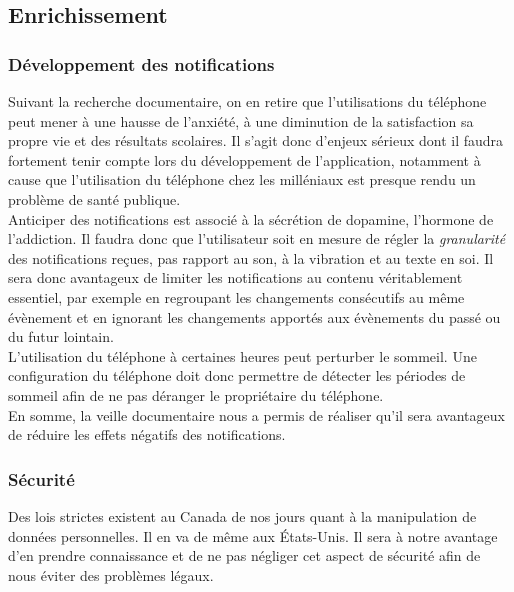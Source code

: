 	\subsection{Enrichissement}
	
		\subsubsection{Développement des notifications}

		Suivant la recherche documentaire, on en retire que l'utilisations du téléphone peut mener à une hausse de l'anxiété, à une diminution de la satisfaction sa propre vie et des résultats scolaires. Il s'agit donc d'enjeux sérieux dont il faudra fortement tenir compte lors du développement de l'application, notamment à cause que l'utilisation du téléphone chez les milléniaux est presque rendu un problème de santé publique. \\
		
		Anticiper des notifications est associé à la sécrétion de dopamine, l'hormone de l'addiction. Il faudra donc que l'utilisateur soit en mesure de régler la \emph{granularité} des notifications reçues, pas rapport au son, à la vibration et au texte en soi. Il sera donc avantageux de limiter les notifications au contenu véritablement essentiel, par exemple en regroupant les changements consécutifs au même évènement et en ignorant les changements apportés aux évènements du passé ou du futur lointain. \\
			
		L'utilisation du téléphone à certaines heures peut perturber le sommeil. Une configuration du téléphone doit donc permettre de détecter les périodes de sommeil afin de ne pas déranger le propriétaire du téléphone. \\
		
		En somme, la veille documentaire nous a permis de réaliser qu'il sera avantageux de réduire les effets négatifs des notifications.
	
		\subsubsection{Sécurité}
		Des lois strictes existent au Canada de nos jours quant à la manipulation de données personnelles. Il en va de même aux États-Unis. Il sera à notre avantage d'en prendre connaissance et de ne pas négliger cet aspect de sécurité afin de nous éviter des problèmes légaux. \\
		

